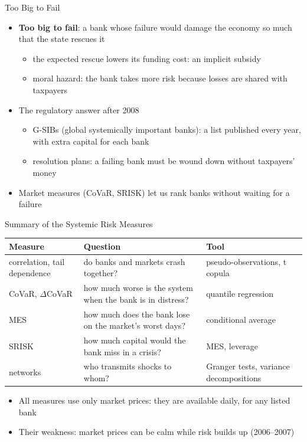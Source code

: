 \begin{frame}{Too Big to Fail}
\itemsize{\small}
\begin{itemize}
    \item \textbf{Too big to fail}: a bank whose failure would damage the economy so much that the state rescues it
    \begin{itemize}
        \item the expected rescue lowers its funding cost: an implicit subsidy
        \item moral hazard: the bank takes more risk because losses are shared with taxpayers
    \end{itemize}
    \item The regulatory answer after 2008 
    \begin{itemize}
        \item G-SIBs (global systemically important banks): a list published every year, with extra capital for each bank
        \item resolution plans: a failing bank must be wound down without taxpayers' money
    \end{itemize}
    \item Market measures (CoVaR, SRISK) let us rank banks without waiting for a failure
\end{itemize}
\end{frame}

\begin{frame}{Summary of the Systemic Risk Measures}
\itemsize{\small}
\begin{center}
\footnotesize
\begin{tabular}{>{\raggedright\arraybackslash}p{2.4cm}>{\raggedright\arraybackslash}p{5.6cm}>{\raggedright\arraybackslash}p{3.4cm}}
\toprule
\textbf{Measure} & \textbf{Question} & \textbf{Tool} \\
\midrule
correlation, tail dependence & do banks and markets crash together? & pseudo-observations, t copula \\
CoVaR, $\Delta$CoVaR & how much worse is the system when the bank is in distress? & quantile regression \\
MES & how much does the bank lose on the market's worst days? & conditional average \\
SRISK & how much capital would the bank miss in a crisis? & MES, leverage \\
networks & who transmits shocks to whom? & Granger tests, variance decompositions \\
\bottomrule
\end{tabular}
\end{center}
\begin{itemize}
    \item All measures use only market prices: they are available daily, for any listed bank
    \item Their weakness: market prices can be calm while risk builds up (2006--2007)
\end{itemize}
\end{frame}


